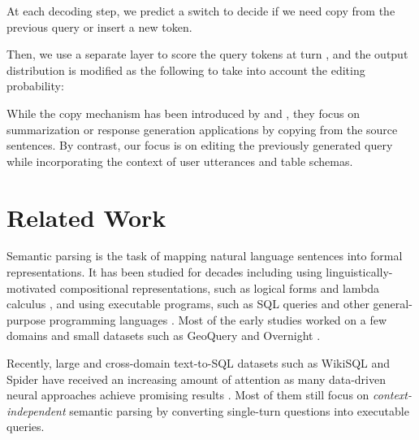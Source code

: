 \documentclass[11pt,a4paper]{article}
\begin{document}
At each decoding step, we predict a switch  to decide if we need copy from the previous query or insert a new token.

Then, we use a separate layer to score the query tokens at turn , and the output distribution is modified as the following to take into account the editing probability:




While the copy mechanism has been introduced by  and , they focus on summarization or response generation applications by copying from the source sentences.
By contrast, our focus is on editing the previously generated query while incorporating the context of user utterances and table schemas. 

\vspace{-2mm}
\section{Related Work}
\vspace{-2mm}
Semantic parsing is the task of mapping natural language sentences into formal representations.
It has been studied for decades including using linguistically-motivated compositional representations, such as logical forms \cite{zelle96,clarke2010driving} and lambda calculus \cite{zettlemoyer2005learning,artzi2011bootstrapping}, and using executable programs, such as SQL queries \cite{miller1996fully,zhong2017seq} and other general-purpose programming languages \cite{yin2017syntactic,iyer2018mapping}.
Most of the early studies worked on a few domains and small datasets such as GeoQuery \cite{zelle96} and Overnight \cite{wang2015building}.

Recently, large and cross-domain text-to-SQL datasets such as WikiSQL \cite{zhong2017seq} and Spider \cite{yu2018spider} have received an increasing amount of attention as many data-driven neural approaches achieve promising results \cite{dong2016language, su2017cross, iyer2017learning, xu2017sqlnet, dollak2018improving, yu2018typesql, huang2018natural, dong2018coarse, sun2018semantic, gur2018dialsql, guo2018question, yavuz2018takes, shi2018incsql}.
Most of them still focus on \textit{context-independent} semantic parsing by converting single-turn questions into executable queries.
\end{document}
